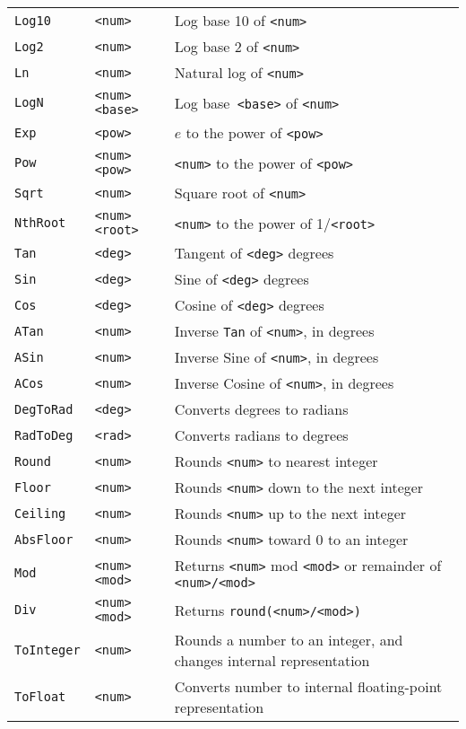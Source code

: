 \begin{longtable}{p{3cm}p{3cm}p{6cm}}
\midrule
\verb+Log10+ &\verb+<num>+ &Log base 10 of \verb+<num>+\\ 
\verb+Log2+ &\verb+<num>+ &Log base 2 of \verb+<num>+ \\ 
\verb+Ln+ &\verb+<num>+ &Natural log of \verb+<num>+\\ 
\verb+LogN+ &\verb+<num> <base>+ &Log base\verb+ <base>+ of \verb+<num>+\\ 
\verb+Exp+ &\verb+<pow>+ &$e$ to the power of \verb+<pow>+ \\ 
\verb+Pow+ &\verb+<num> <pow>+ &\verb+<num>+ to the power of \verb+<pow>+\\ 
\verb+Sqrt+ &\verb+<num>+ &Square root of \verb+<num>+\\ 
\verb+NthRoot+ &\verb+<num> <root>+ &\verb+<num>+ to the power of 1/\verb+<root>+\\ 
\verb+Tan+ &\verb+<deg>+ &Tangent of \verb+<deg>+ degrees \\ 
\verb+Sin+ &\verb+<deg>+ &Sine of \verb+<deg>+ degrees \\ 
\verb+Cos+ &\verb+<deg>+ &Cosine of \verb+<deg>+ degrees \\ 
\verb+ATan+ &\verb+<num>+ &Inverse \verb+Tan+ of \verb+<num>+, in degrees\\ 
\verb+ASin+ &\verb+<num>+ &Inverse Sine of \verb+<num>+, in degrees\\ 
\verb+ACos+ &\verb+<num>+ &Inverse Cosine of \verb+<num>+, in degrees\\ 
\verb+DegToRad+ &\verb+<deg>+ &Converts degrees to radians\\ 
\verb+RadToDeg+ &\verb+<rad>+ &Converts radians to degrees\\ 
\verb+Round+ &\verb+<num>+ &Rounds \verb+<num>+ to nearest integer\\ 
\verb+Floor+ &\verb+<num>+ &Rounds \verb+<num>+ down to the next integer\\ 
\verb+Ceiling+ &\verb+<num>+ &Rounds \verb+<num>+ up to the next integer\\ 
\verb+AbsFloor+ &\verb+<num>+ &Rounds \verb+<num>+ toward 0 to an integer\\ 
\verb+Mod+ &\verb+<num> <mod>+ &Returns \verb+<num>+ mod \verb+<mod>+ or remainder of \verb+<num>/<mod>+ \\ 
\verb+Div+ &\verb+<num> <mod>+ &Returns \verb+round(<num>/<mod>)+ \\ 
\verb+ToInteger+ &\verb+<num>+ &Rounds a number to an integer, and changes internal representation\\ 
\verb+ToFloat+ &\verb+<num>+ &Converts number to internal floating-point representation\\ 

\end{longtable}
